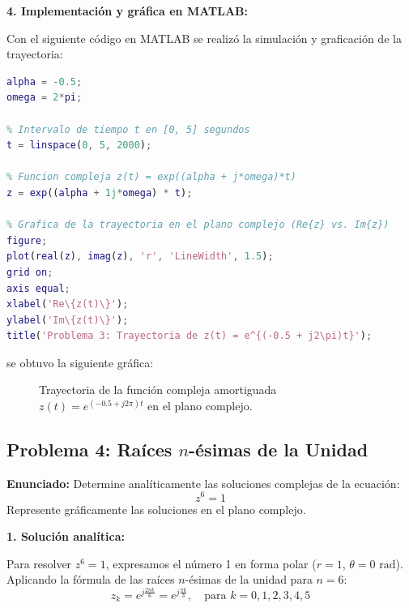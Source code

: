 \documentclass[11pt,a4paper]{article}
\begin{document}
\noindent\textbf{4. Implementación y gráfica en MATLAB:}

Con el siguiente código en MATLAB se realizó la simulación y graficación de la trayectoria:

\begin{lstlisting}[language=Matlab, frame=single, basicstyle=\small\ttfamily, keywordstyle=\color{blue}, commentstyle=\color{green!50!black}]
% Parametros de la funcion compleja
alpha = -0.5;
omega = 2*pi;

% Intervalo de tiempo t en [0, 5] segundos
t = linspace(0, 5, 2000);

% Funcion compleja z(t) = exp((alpha + j*omega)*t)
z = exp((alpha + 1j*omega) * t);

% Grafica de la trayectoria en el plano complejo (Re{z} vs. Im{z})
figure;
plot(real(z), imag(z), 'r', 'LineWidth', 1.5);
grid on;
axis equal;
xlabel('Re\{z(t)\}');
ylabel('Im\{z(t)\}');
title('Problema 3: Trayectoria de z(t) = e^{(-0.5 + j2\pi)t}');
\end{lstlisting}

\noindent se obtuvo la siguiente gráfica:

\begin{figure}[htbp]
    \centering
    \caption{Trayectoria de la función compleja amortiguada $z(t) = e^{(-0.5 + j2\pi)t}$ en el plano complejo.}
    \label{fig:problema3_trayectoria}
\end{figure}

\subsection{Problema 4: Raíces \texorpdfstring{$n$}{n}-ésimas de la Unidad}

\noindent\textbf{Enunciado:} Determine analíticamente las soluciones complejas de la ecuación:
\[
z^6 = 1
\]
Represente gráficamente las soluciones en el plano complejo.

\noindent\textbf{1. Solución analítica:}

Para resolver $z^6 = 1$, expresamos el número 1 en forma polar ($r = 1$, $\theta = 0\text{ rad}$). Aplicando la fórmula de las raíces $n$-ésimas de la unidad para $n = 6$:
\[
z_k = e^{j\frac{2\pi k}{6}} = e^{j\frac{\pi k}{3}}, \quad \text{para } k = 0, 1, 2, 3, 4, 5
\]
\end{document}
